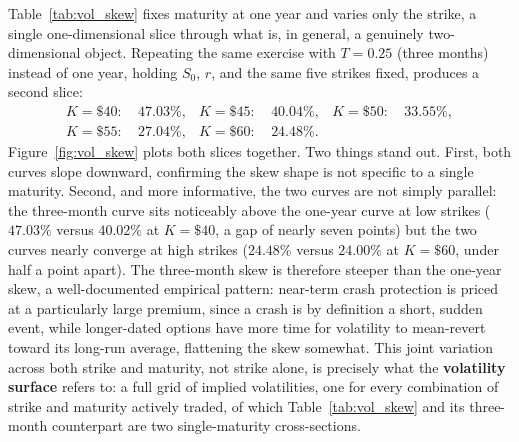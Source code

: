 \documentclass[../ai_in_finance]{subfiles}
\begin{document}
Table~\ref{tab:vol_skew} fixes maturity at one year and varies only the strike, a single one-dimensional slice through what is, in general, a genuinely two-dimensional object. Repeating the same exercise with $T=0.25$ (three months) instead of one year, holding $S_0$, $r$, and the same five strikes fixed, produces a second slice:
\begin{align*}
K=\$40: &\ 47.03\%, & K=\$45: &\ 40.04\%, & K=\$50: &\ 33.55\%, \\
K=\$55: &\ 27.04\%, & K=\$60: &\ 24.48\%. & &
\end{align*}
Figure~\ref{fig:vol_skew} plots both slices together. Two things stand out. First, both curves slope downward, confirming the skew shape is not specific to a single maturity.
Second, and more informative, the two curves are not simply parallel: the three-month curve sits noticeably above the one-year curve at low strikes ($47.03\%$ versus $40.02\%$ at $K=\$40$, a gap of nearly seven points) but the two curves nearly converge at high strikes ($24.48\%$ versus $24.00\%$ at $K=\$60$, under half a point apart). The three-month skew is therefore steeper than the one-year skew, a well-documented empirical pattern: near-term crash protection is priced at a particularly large premium, since a crash is by definition a short, sudden event, while longer-dated options have more time for volatility to mean-revert toward its long-run average, flattening the skew somewhat.
This joint variation across both strike and maturity, not strike alone, is precisely what the \textbf{volatility surface} refers to: a full grid of implied volatilities, one for every combination of strike and maturity actively traded, of which Table~\ref{tab:vol_skew} and its three-month counterpart are two single-maturity cross-sections.
\end{document}
